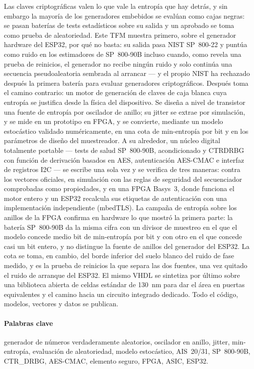 \documentclass[12pt, a4paper, oneside]{report}
\begin{document}
Las claves criptogr\'aficas valen lo que vale la entrop\'ia que hay
detr\'as, y sin embargo la mayor\'ia de los generadores embebidos se
eval\'uan como cajas negras: se pasan bater\'ias de tests estad\'isticos
sobre su salida y un aprobado se toma como prueba de aleatoriedad. Este
TFM muestra primero, sobre el generador hardware del ESP32, por qu\'e no
basta: su salida pasa NIST SP~800-22 y punt\'ua como ruido en los
estimadores de SP~800-90B incluso cuando, como revela una prueba de
reinicios, el generador no recibe ning\'un ruido y solo contin\'ua una
secuencia pseudoaleatoria sembrada al arrancar --- y el propio NIST ha
rechazado despu\'es la primera bater\'ia para evaluar generadores
criptogr\'aficos. Despu\'es toma el camino contrario: un motor de
generaci\'on de claves de caja blanca cuya
entrop\'ia se justifica desde la f\'isica del dispositivo. Se dise\~na a
nivel de transistor una fuente de entrop\'ia por oscilador de anillo; su
jitter se extrae por simulaci\'on, y se mide en un prototipo en FPGA, y
se convierte, mediante un modelo estoc\'astico validado num\'ericamente,
en una cota de min-entrop\'ia por bit y en los par\'ametros de dise\~no del
muestreador. A su alrededor, un n\'ucleo digital totalmente portable ---
tests de salud SP~800-90B, acondicionado y \acs{CTRDRBG} con funci\'on de
derivaci\'on basados en AES, autenticaci\'on AES-CMAC e interfaz de
registros \acs{I2C} --- se escribe una sola vez y se verifica de tres
maneras: contra los vectores oficiales, en simulaci\'on con las reglas de
seguridad del secuenciador comprobadas como propiedades, y en una FPGA
Basys~3, donde funciona el motor entero y un ESP32 recalcula sus
etiquetas de autenticaci\'on con una implementaci\'on independiente
(mbedTLS). La campa\~na de entrop\'ia sobre los anillos de la FPGA
confirma en hardware lo que mostr\'o la primera parte: la bater\'ia
SP~800-90B da la misma cifra con un divisor de muestreo en el que el
modelo concede medio bit de min-entrop\'ia por bit y con otro en el que
concede casi un bit entero, y no distingue la fuente de anillos del
generador del ESP32. La cota se toma, en cambio, del borde inferior del
suelo blanco del ruido de fase medido, y es la prueba de reinicios la que
separa las dos fuentes, una vez quitado el ruido de arranque del ESP32.
El mismo VHDL se sintetiza
por \'ultimo sobre una biblioteca abierta de celdas est\'andar de 130~nm
para dar el \'area en puertas equivalentes y el camino hacia un circuito
integrado dedicado. Todo el c\'odigo, modelos, vectores y datos se
publican.

\paragraph{Palabras clave} generador de n\'umeros verdaderamente
aleatorios, oscilador en anillo, jitter, min-entrop\'ia, evaluaci\'on de
aleatoriedad, modelo estoc\'astico, AIS~20/31, SP~800-90B, CTR\_DRBG,
AES-CMAC, elemento seguro, FPGA, ASIC, ESP32.
\end{document}
